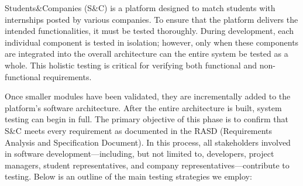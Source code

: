 Students\&Companies (S\&C) is a platform designed to match students with internships posted by various companies. To ensure that the platform delivers the intended functionalities, it must be tested thoroughly. During development, each individual component is tested in isolation; however, only when these components are integrated into the overall architecture can the entire system be tested as a whole. This holistic testing is critical for verifying both functional and non-functional requirements.

Once smaller modules have been validated, they are incrementally added to the platform’s software architecture. After the entire architecture is built, system testing can begin in full. The primary objective of this phase is to confirm that S\&C meets every requirement as documented in the RASD (Requirements Analysis and Specification Document). In this process, all stakeholders involved in software development—including, but not limited to, developers, project managers, student representatives, and company representatives—contribute to testing. Below is an outline of the main testing strategies we employ:


